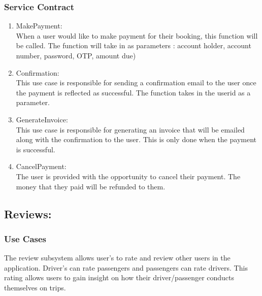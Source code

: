 \documentclass[hidelinks, 12pt, a4paper]{article}
\begin{document}
\subsubsection{Service Contract}
\begin{enumerate}[label=U1.\arabic*]

      \item MakePayment:\\
            When a user would like to make payment for their booking, this function will be called. The function will take in as parameters : account holder, account number, password, OTP, amount due)

      \item Confirmation:\\
            This use case is responsible for sending a confirmation email to the user once the payment is reflected as successful. The function takes in the userid as a parameter.

      \item GenerateInvoice:\\
            This use case is responsible for generating an invoice that will be emailed along with the confirmation to the user. This is only done when the payment is successful.

      \item CancelPayment: \\
            The user is provided with the opportunity to cancel their payment. The money that they paid will be refunded to them.


\end{enumerate}

\vspace{1cm}
\subsection{Reviews:}
\subsubsection{Use Cases}
The review subsystem allows user’s to rate and review other users in the application. Driver’s can rate passengers and passengers can rate drivers. This rating allows users to gain insight on how their driver/passenger conducts themselves on trips.
\end{document}
